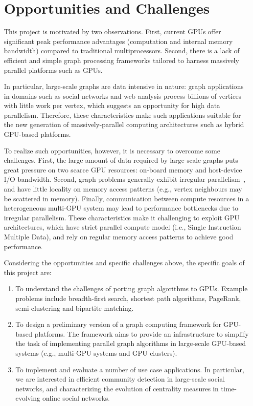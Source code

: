 \section{Opportunities and Challenges}
\label{sec:opp}

This project is motivated by two observations. First, current GPUs offer significant peak performance advantages (computation and internal memory bandwidth) compared to traditional multiprocessors. Second, there is a lack of efficient and simple graph processing frameworks tailored to harness massively parallel platforms such as GPUs. 

In particular, large-scale graphs are data intensive in nature: graph applications in domains such as social networks and web analysis process billions of vertices with little work per vertex, which suggests an opportunity for high data parallelism. Therefore, these characteristics make such applications suitable for the new generation of massively-parallel computing architectures such as hybrid GPU-based platforms.

To realize such opportunities, however, it is necessary to overcome some challenges. First, the large amount of data required by large-scale graphs puts great pressure on two scarce GPU resources: on-board memory and host-device I/O bandwidth. Second, graph problems generally exhibit irregular parallelism~\cite{Kulkarni2009}, and have little locality on memory access patterns (e.g., vertex neighbours may be scattered in memory). Finally, communication between compute resources in a heterogeneous multi-GPU system may lead to performance bottlenecks due to irregular parallelism. These characteristics make it challenging to exploit GPU architectures, which have strict parallel compute model (i.e., Single Instruction Multiple Data), and rely on regular memory access patterns to achieve good performance.

Considering the opportunities and specific challenges above, the specific goals of this project are:

\begin{enumerate}
\item To understand the challenges of porting graph algorithms to GPUs. Example problems include breadth-first search, shortest path algorithms, PageRank, semi-clustering and bipartite matching.

\item To design a preliminary version of a graph computing framework for GPU-based platforms. The framework aims to provide an infrastructure to simplify the task of implementing parallel graph algorithms in large-scale GPU-based systems (e.g., multi-GPU systems and GPU clusters).

\item To implement and evaluate a number of use case applications. In particular, we are interested in efficient community detection in large-scale social networks, and characterizing the evolution of centrality measures in time-evolving online social networks. 
\end{enumerate}
